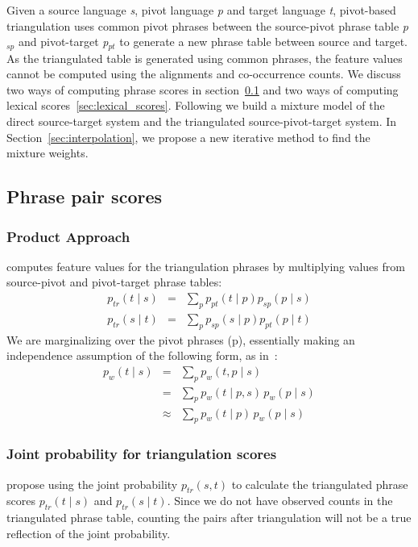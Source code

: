 \documentclass[11pt]{article}
\begin{document}
	Given a source language \emph{s}, pivot language \emph{p} and target language \emph{t}, pivot-based triangulation uses common pivot phrases between the source-pivot phrase table \emph{p$_{sp}$} and pivot-target \emph{p$_{pt}$} to generate a new phrase table between source and target. As the triangulated table is generated using common phrases, the feature values cannot be computed using the alignments and co-occurrence counts. We discuss two ways of computing phrase scores in section~\ref{sec:phrase_scores} and two ways of computing lexical scores~\ref{sec:lexical_scores}. Following \cite{Cohn:07} we build a mixture model of the direct source-target system and the triangulated source-pivot-target system. In Section~\ref{sec:interpolation}, we propose a new iterative method to find the mixture weights.

\subsection{Phrase pair scores}
\label{sec:phrase_scores}

\subsubsection{Product Approach} \cite{Utiyama:07} computes feature values for the triangulation phrases by multiplying values from source-pivot and pivot-target phrase tables:
	\begin{eqnarray} 
	    \label{eq:forward}
        p_{tr}(t \mid s) &=& \sum_{p} p_{pt}(t \mid p) p_{sp}(p \mid s) \\
        \label{eq:backward}
        p_{tr}(s \mid t) &=& \sum_{p} p_{sp}(s \mid p) p_{pt}(p \mid t)
	\end{eqnarray}
	We are marginalizing over the pivot phrases (p), essentially making an independence assumption of the following form, as in~\cite{Cohn:07}:  
	\begin{eqnarray*}
		p_w(t \mid s)&=&\sum_{p}{p_w(t, p \mid s)}\\
		&=& \sum_{p}{p_w(t \mid p, s)\,p_w(p \mid s)}\\
		&\approx& \sum_{p}{p_w(t \mid p)\,p_w(p \mid s)}
	\end{eqnarray*}

\subsubsection{Joint probability for triangulation scores}
\label{sec:joint}
	\cite{Cohn:07} propose using the joint probability $p_{tr}(s, t)$ to calculate the triangulated phrase scores $p_{tr}(t \mid s)$ and $p_{tr}(s \mid t)$. Since we do not have observed counts in the triangulated phrase table, counting the pairs after triangulation will not be a true reflection of the joint probability. %
\end{document}
